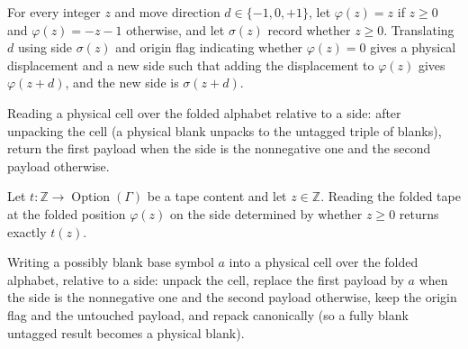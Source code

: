 \begin{lemma}
\label{Turing.FinTM.foldMove_correct}
\leanok
{}
For every integer $z$ and move direction $d\in\{-1,0,+1\}$, let $\varphi(z)=z$ if $z\ge
0$ and $\varphi(z)=-z-1$ otherwise, and let $\sigma(z)$ record whether $z\ge 0$.
Translating $d$ using side $\sigma(z)$ and origin flag indicating whether $\varphi(z)=0$
gives a physical displacement and a new side such that adding the displacement to
$\varphi(z)$ gives $\varphi(z+d)$, and the new side is $\sigma(z+d)$.
\end{lemma}

\begin{definition}
\label{Turing.FinTM.foldRead}
\leanok
{}
Reading a physical cell over the folded alphabet relative to a side: after unpacking
the cell (a physical blank unpacks to the untagged triple of blanks), return the
first payload when the side is the nonnegative one and the second payload otherwise.
\end{definition}

\begin{lemma}
\label{Turing.FinTM.foldRead_tape}
\leanok
{}
Let $t\colon\mathbb{Z}\to\operatorname{Option}(\Gamma)$ be a tape content and let
$z\in\mathbb{Z}$. Reading the folded tape at the folded position $\varphi(z)$ on the
side determined by whether $z\ge 0$ returns exactly $t(z)$.
\end{lemma}

\begin{definition}
\label{Turing.FinTM.foldWrite}
\leanok
{}
Writing a possibly blank base symbol $a$ into a physical cell over the folded
alphabet, relative to a side: unpack the cell, replace the first payload by $a$ when
the side is the nonnegative one and the second payload otherwise, keep the origin
flag and the untouched payload, and repack canonically (so a fully blank untagged
result becomes a physical blank).
\end{definition}

